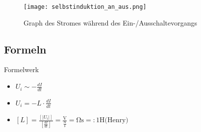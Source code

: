 \begin{frame}
    \makeframetitle
    \begin{figure}
        \texttt{[image: selbstinduktion\_an\_aus.png]}
        \caption{Graph des Stromes während des Ein-/Ausschaltevorgangs\cite{abiweb_ein_aus}}
    \end{figure}
\end{frame}

\subsection{Formeln}
\begin{frame}
    \makeframetitle
    \begin{block}{Formelwerk}
        \begin{itemize}
            \item $U_i \sim -\frac{dI}{dt}$
            \item $U_i = -L \cdot \frac{dI}{dt}$
            \item $[L] = \frac{\left[|U_i|\right]}{\left[\frac{dI}{dt}\right]}
                = \frac{\unit\volt}{\frac{\unit\ampere}{\unit\second}}
                = \unit{\ohm\second} =: 1\unit{\henry}\text{(Henry)}$
        \end{itemize}
    \end{block}
\end{frame}
